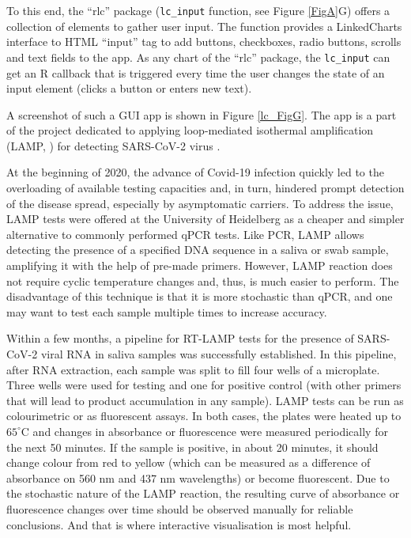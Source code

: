 \documentclass[twocolumn,10pt]{article}
\begin{document}
To this end, the ``rlc'' package (\texttt{lc_input} function, see Figure \ref{FigA}G) offers a collection of elements to gather user input. The function provides a LinkedCharts interface to HTML ``input'' tag to add buttons, checkboxes, radio buttons, scrolls and text fields to the app. As any chart of the ``rlc'' package, the \texttt{lc_input} can get an R callback that is triggered every time the user changes the state of an input element (clicks a button or enters new text).

A screenshot of such a GUI app is shown in Figure \ref{lc_FigG}. The app is a part of the project dedicated to applying loop-mediated isothermal amplification (LAMP, \citep{notomi_2000}) for detecting SARS-CoV-2 virus \citep{herbst_2021}.

At the beginning of 2020, the advance of Covid-19 infection quickly led to the overloading of available testing capacities and, in turn, hindered prompt detection of the disease spread, especially by asymptomatic carriers. To address the issue, LAMP tests were offered at the University of Heidelberg as a cheaper and simpler alternative to commonly performed qPCR tests. Like PCR, LAMP allows detecting the presence of a specified DNA sequence in a saliva or swab sample, amplifying it with the help of pre-made primers. However, LAMP reaction does not require cyclic temperature changes and, thus, is much easier to perform. The disadvantage of this technique is that it is more stochastic than qPCR, and one may want to test each sample multiple times to increase accuracy. 

Within a few months, a pipeline for RT-LAMP tests for the presence of SARS-CoV-2 viral RNA in saliva samples was successfully established. In this pipeline, after RNA extraction, each sample was split to fill four wells of a microplate. Three wells were used for testing and one for positive control (with other primers that will lead to product accumulation in any sample). LAMP tests can be run as colourimetric or as fluorescent assays. In both cases, the plates were heated up to $65^\circ$C and changes in absorbance or fluorescence were measured periodically for the next 50 minutes. If the sample is positive, in about 20 minutes, it should change colour from red to yellow (which can be measured as a difference of absorbance on 560 nm and 437 nm wavelengths) or become fluorescent. Due to the stochastic nature of the LAMP reaction, the resulting curve of absorbance or fluorescence changes over time should be observed manually for reliable conclusions. And that is where interactive visualisation is most helpful.
\end{document}
